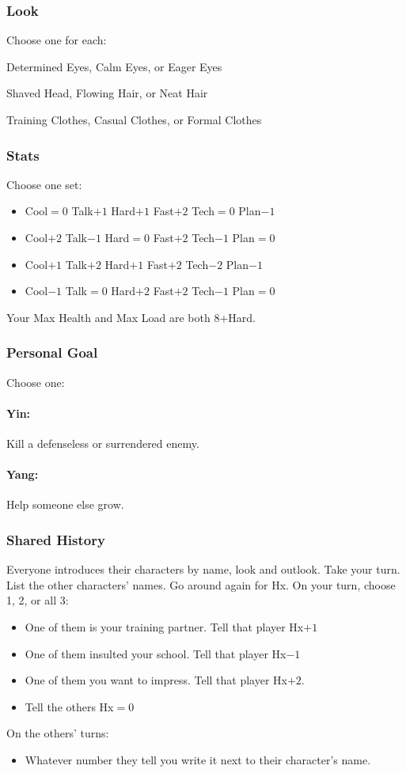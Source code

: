 \subsubsection{Look}
Choose one for each:

Determined Eyes, Calm Eyes, or Eager Eyes

Shaved Head, Flowing Hair, or Neat Hair

Training Clothes, Casual Clothes, or Formal Clothes

\subsubsection{Stats}
Choose one set:
\begin{itemize}
\setlength\itemsep{0em}
\item Cool${=}0$ Talk$+1$ Hard$+1$ Fast$+2$ Tech${=}0$ Plan$-1$
\item Cool$+2$ Talk$-1$ Hard${=}0$ Fast$+2$ Tech$-1$ Plan${=}0$
\item Cool$+1$ Talk$+2$ Hard$+1$ Fast$+2$ Tech$-2$ Plan$-1$
\item Cool$-1$ Talk${=}0$ Hard$+2$ Fast$+2$ Tech$-1$ Plan${=}0$
\end{itemize}

Your Max Health and Max Load are both 8+Hard.

\subsubsection{Personal Goal}
Choose one:
\paragraph{Yin:} Kill a defenseless or surrendered enemy.
\paragraph{Yang:} Help someone else grow.

\subsubsection{Shared History}
Everyone introduces their characters by name, look and outlook. Take
your turn. List the other characters' names. Go around again for
Hx. On your turn, choose 1, 2, or all 3:
\begin{itemize} %
\item One of them is your training partner. Tell that player Hx$+1$
\item One of them insulted your school. Tell that player Hx$-1$
\item One of them you want to impress. Tell that player Hx$+2$.
\item Tell the others Hx${=}0$
\end{itemize}
On the others’ turns:
\begin{itemize} %
\item Whatever number they tell you write it next to their character’s
  name.
\end{itemize}

